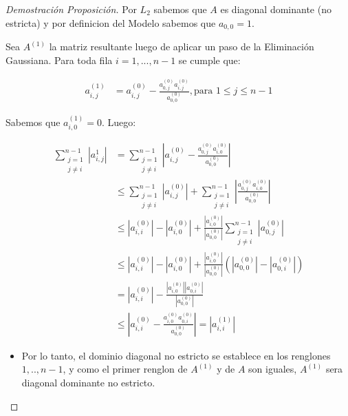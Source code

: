 \begin{proof}[Demostración Proposición]

Por $L_{2}$ sabemos que $A$ es diagonal dominante (no estricta) y por definicion del Modelo sabemos que $a_{0,0} = 1$.

Sea $A^{(1)}$ la matriz resultante luego de aplicar un paso de la Eliminación Gaussiana. Para toda fila $i = 1,...,n-1$ se cumple que:

\begin{equation*}
    \begin{aligned}
      a^{(1)}_{i,j} &= a^{(0)}_{i,j} - \frac{a^{(0)}_{0,j}a^{(0)}_{i,j}}{a^{(0)}_{0,0}}, \text{para } 1 \leq j \leq n-1
    \end{aligned}
\end{equation*}

Sabemos que $a^{(1)}_{i,0} = 0$. Luego:

\begin{equation*}
    \begin{aligned}
      \sum\limits_{\substack{j=1  \\ j \neq i}}^{n-1} |a^{1}_{i,j}| &= \sum\limits_{\substack{j=1  \\ j \neq i}}^{n-1} |a^{(0)}_{i,j} - \frac{a^{(0)}_{0,j}a^{(0)}_{i,0}}{a^{(0)}_{0,0}}| \\
      &\leq \sum\limits_{\substack{j=1  \\ j \neq i}}^{n-1} |a^{(0)}_{i,j}| + \sum\limits_{\substack{j=1  \\ j \neq i}}^{n-1} |\frac{a^{(0)}_{0,j}a^{(0)}_{i,0}}{a^{(0)}_{0,0}}| \\
      &\leq |a^{(0)}_{i,i}| - |a^{(0)}_{i,0}| +  \frac{|a^{(0)}_{i,0}|}{|a^{(0)}_{0,0}|} \sum\limits_{\substack{j=1  \\ j \neq i}}^{n-1} |a^{(0)}_{0,j}| \\
      &\leq |a^{(0)}_{i,i}| - |a^{(0)}_{i,0}| +  \frac{|a^{(0)}_{i,0}|}{|a^{(0)}_{0,0}|} (|a^{(0)}_{0,0}| - |a^{(0)}_{0,i}|) \\
      &= |a^{(0)}_{i,i}| - \frac{|a^{(0)}_{i,0}||a^{(0)}_{0,i}|}{|a^{(0)}_{0,0}|} \\
      &\leq |a^{(0)}_{i,i} - \frac{a^{(0)}_{i,0}a^{(0)}_{0,i}}{a^{(0)}_{0,0}}| = |a^{(1)}_{i,i}|
    \end{aligned}
\end{equation*}

\begin{itemize}


\item Por lo tanto, el dominio diagonal no estricto se establece en los renglones $1,..,n-1$, y como el primer renglon de $A^{(1)}$ y de $A$ son iguales,
$A^{(1)}$ sera diagonal dominante no estricto.


\end{itemize}
\end{proof}
